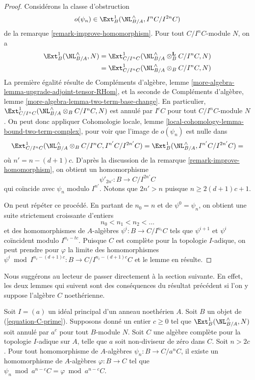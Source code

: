 \begin{proof}
Considérons la classe d'obstruction
$$
o(\psi_n) \in \Ext^1_B(\NL_{B/A}^\wedge, I^nC/I^{2n}C)
$$
de la remarque \ref{remark-improve-homomorphism}. Pour tout $C/I^nC$-module
$N$, on a
\begin{align*}
\Ext^1_B(\NL_{B/A}^\wedge, N)
& =
\Ext^1_{C/I^nC}(\NL_{B/A}^\wedge \otimes_B^\mathbf{L} C/I^nC, N) \\
& =
\Ext^1_{C/I^nC}(\NL_{B/A}^\wedge \otimes_B C/I^nC, N)
\end{align*}
La première égalité résulte de Compléments d'algèbre, lemme
\ref{more-algebra-lemma-upgrade-adjoint-tensor-RHom}, et la seconde de
Compléments d'algèbre, lemme
\ref{more-algebra-lemma-two-term-base-change}. En particulier,
$\Ext^1_{C/I^nC}(\NL_{B/A}^\wedge \otimes_B C/I^nC, N)$ est annulé par
$I^cC$ pour tout $C/I^nC$-module $N$. On peut donc appliquer Cohomologie
locale, lemme \ref{local-cohomology-lemma-bound-two-term-complex}, pour voir
que l'image de $o(\psi_n)$ est nulle dans
$$
\Ext^1_{C/I^nC}(\NL_{B/A}^\wedge \otimes_B C/I^nC, I^{n'}C/I^{2n'}C) =
\Ext^1_B(\NL_{B/A}^\wedge, I^{n'}C/I^{2n'}C) =
$$
où $n' = n - (d + 1)c$. D'après la discussion de la remarque
\ref{remark-improve-homomorphism}, on obtient un homomorphisme
$$
\psi'_{2n'} : B \to C/I^{2n'}C
$$
qui coïncide avec $\psi_n$ modulo $I^{n'}$. Notons que $2n' > n$ puisque
$n \geq 2(d + 1)c + 1$.

\medskip\noindent
On peut répéter ce procédé. En partant de $n_0 = n$ et de
$\psi^0 = \psi_n$, on obtient une suite strictement croissante d'entiers
$$
n_0 < n_1 < n_2 < \ldots
$$
et des homomorphismes de $A$-algèbres $\psi^i : B \to C/I^{n_i}C$ tels que
$\psi^{i + 1}$ et $\psi^i$ coïncident modulo $I^{n_i - tc}$. Puisque $C$ est
complète pour la topologie $I$-adique, on peut prendre pour $\varphi$ la
limite des homomorphismes
$\psi^i \bmod I^{n_i - (d + 1)c} : B \to C/I^{n_i - (d + 1)c}C$
et le lemme en résulte.
\end{proof}

\noindent
Nous suggérons au lecteur de passer directement à la section suivante. En
effet, les deux lemmes qui suivent sont des conséquences du résultat précédent
si l'on y suppose l'algèbre $C$ noethérienne.

\begin{lemma}
\label{lemma-get-morphism-nonzerodivisor}
Soit $I = (a)$ un idéal principal d'un anneau noethérien $A$. Soit $B$ un
objet de (\ref{equation-C-prime}). Supposons donné un entier $c \geq 0$ tel
que $\Ext^1_B(\NL_{B/A}^\wedge, N)$ soit annulé par $a^c$ pour tout
$B$-module $N$. Soit $C$ une algèbre complète pour la topologie $I$-adique
sur $A$, telle que $a$ soit non-diviseur de zéro dans $C$. Soit $n > 2c$.
Pour tout homomorphisme de $A$-algèbres $\psi_n : B \to C/a^nC$, il existe
un homomorphisme de $A$-algèbres $\varphi : B \to C$ tel que
$\psi_n \bmod a^{n - c}C = \varphi \bmod a^{n - c}C$.
\end{lemma}

